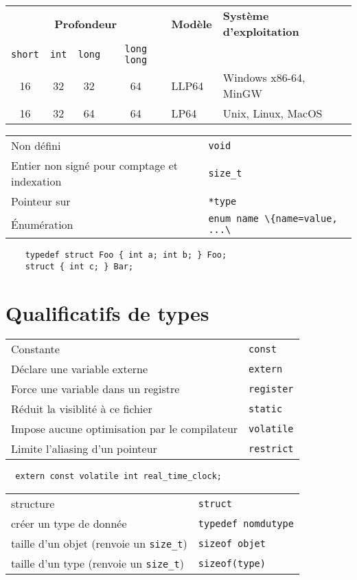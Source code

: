 \documentclass{article}
\newcommand{\key}[2]{#1 &\texttt{#2} \\ }
\newenvironment{keylist}
     {\noindent\begin{tabular*}{\linewidth}{ll}} %
     {\end{tabular*}}
\newcommand{\cd}{\lstinline}
\begin{document}
\begin{multicols*}{3}
  \begin{tabularx}{\linewidth}{cccclX}
    \multicolumn{4}{c}{\bf Profondeur} & \bf Modèle & \bf Système d'exploitation \\
    \cd {short} & \cd{int} & \cd{long} & \cd{long long} & & \\
    \hline
    16 & 32 & 32 & 64 & LLP64 & Windows x86-64, MinGW \\
    16 & 32 & 64 & 64 & LP64 & Unix, Linux, MacOS
  \end{tabularx}

  \begin{tabularx}{\linewidth}{Xl}
    Non défini                 & \cd{void} \\
    Entier non signé pour comptage et indexation & \cd{size_t} \\
    Pointeur sur                       & \cd{*type} \\
    Énumération                        & \cd{enum name \{name=value, ...\}};
  \end{tabularx}

  \begin{lstlisting}
    typedef struct Foo { int a; int b; } Foo;
    struct { int c; } Bar;
  \end{lstlisting}
\section*{Qualificatifs de types}

\begin{tabularx}{\linewidth}{Xl}
  Constante                           & \cd{const} \\
  Déclare une variable externe        & \cd{extern} \\
  Force une variable dans un registre & \cd{register} \\
  Réduit la visiblité à ce fichier    & \cd{static} \\
  Impose aucune optimisation par le compilateur & \cd{volatile} \\
  Limite l'aliasing d'un pointeur     & \cd{restrict} \\
\end{tabularx}

\begin{lstlisting}
  extern const volatile int real_time_clock;
\end{lstlisting}

\begin{keylist}

\key{structure}{struct}
\key{créer un type de donnée}{typedef \texttt{nomdutype}}
\key{taille d'un objet (renvoie un \texttt{size\_t})}{sizeof \texttt{objet}}
\key{taille d'un type (renvoie un \texttt{size\_t})}{sizeof(\texttt{type)}}
\end{keylist}


\end{multicols*}
\end{document}
